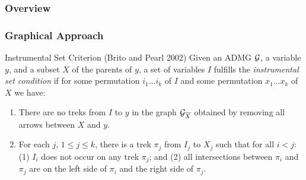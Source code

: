 \documentclass{beamer}
\begin{document}
\begin{frame}
	\frametitle{Overview}
	\begin{figure}
		\centering
	\end{figure}
\end{frame}

\begin{frame}
	\frametitle{Graphical Approach}
	\begin{block}{Instrumental Set Criterion (Brito and Pearl 2002)}
Given an ADMG $\cal
	G$, a variable $y$, and a subset $X$ of the parents of $y$, 
	a set of variables
	$I$ fulfills the 
	\emph{instrumental set condition}
	if for {some} permutation $ i_1 \ldots i_k $ of
	$ I $ and {some} permutation
	$ x_1 \ldots x_k $ of $ X $ we have: 
	\begin{enumerate}
		\item There are no treks from $I$ to $y$ in the graph ${\cal
			G}_{\overline{X}}$ obtained by removing all arrows 
			between $X$ and $y$. 
		\item For each $j$, $1 \leq j \leq k$, there is a trek $\pi_j$ from
			$I_j$ to $X_j$ such that for all $i < j$: (1) $I_i$ does not
			occur on any trek $\pi_j$; and (2) all intersections between
			$\pi_i$ and $\pi_j$ are on the left side of $\pi_i$ and the
			right side of $\pi_j$.
	\end{enumerate}
	\end{block}
\end{frame}
\end{document}
